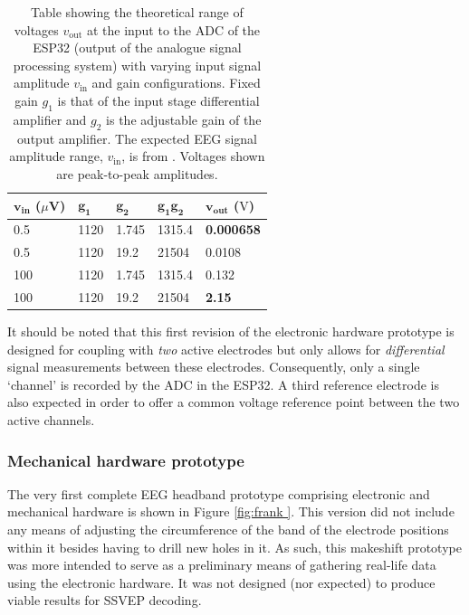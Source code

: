 \begin{table}[]
\centering
\begin{tabular}{@{}lllll@{}}
\toprule
\textbf{$\mathbf{v_{\textrm{in}}}$} ($\mu$V) & \textbf{$\mathbf{g_1}$} & \textbf{$\mathbf{g_2}$} & \textbf{$\mathbf{g_1g_2}$} & \textbf{$\mathbf{v_{\textrm{out}}}$} ($\textrm{V}$)\\ \midrule
0.5          & 1120        & 1.745       & 1315.4          & \textbf{0.000658}        \\
0.5          & 1120        & 19.2        & 21504           & 0.0108          \\
100          & 1120        & 1.745       & 1315.4          & 0.132           \\
100          & 1120        & 19.2        & 21504           & \textbf{2.15}            \\ \bottomrule
\end{tabular}
\caption[Table showing the theoretical range of voltages measured at the ADC of the ESP32 for varying input signal magnitudes and gain configurations]{Table showing the theoretical range of voltages $v_{\textrm{out}}$ at the input to the ADC of the ESP32 (output of the analogue signal processing system) with varying input signal amplitude $v_{\textrm{in}}$ and gain configurations. Fixed gain $g_1$ is that of the input stage differential amplifier and $g_2$ is the adjustable gain of the output amplifier. The expected EEG signal amplitude range, $v_{\textrm{in}}$, is from \cite{teplan-eeg-measurement}. Voltages shown are peak-to-peak amplitudes.}
\label{tab:gain-voltage-ranges}
\end{table}

It should be noted that this first revision of the electronic hardware prototype is designed for coupling with \textit{two} active electrodes but only allows for \textit{differential} signal measurements between these electrodes. Consequently, only a single `channel' is recorded by the ADC in the ESP32. A third reference electrode is also expected in order to offer a common voltage reference point between the two active channels. 

\subsubsection{Mechanical hardware prototype}

The very first complete EEG headband prototype comprising electronic and mechanical hardware is shown in Figure \ref{fig:frank
}. This version did not include any means of adjusting the circumference of the band of the electrode positions within it besides having to drill new holes in it. As such, this makeshift prototype was more intended to serve as a preliminary means of gathering real-life data using the electronic hardware. It was not designed (nor expected) to produce viable results for SSVEP decoding. 

